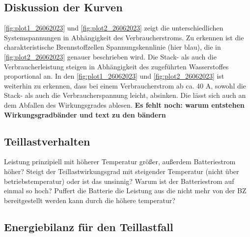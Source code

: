 \subsection{Diskussion der Kurven}
\autoref{fig:plot1_26062023} und \autoref{fig:plot2_26062023} zeigt die unterschiedlichen Systemspannungen in Abhängigkeit des
Verbraucherstroms. Zu erkennen ist die charakteristische Brennstoffzellen Spannungskennlinie (hier
blau), die in \autoref{fig:plot2_26062023} genauer beschrieben wird. Die Stack- als auch die Verbraucherleistung
steigen in Abhängigkeit des zugeführten Wasserstoffes proportional an. In den \autoref{fig:plot1_26062023} und \autoref{fig:plot2_26062023} ist weiterhin zu erkennen, dass bei einem Verbraucherstrom ab ca. 40 A, sowohl die Stack- als
auch die Verbraucherspannung leicht, absinken. Die lässt sich auch an dem Abfallen des
Wirkungsgrades ablesen. \textbf{Es fehlt noch: warum entstehen Wirkungsgradbänder und text zu den bändern}
\subsection{}
\subsection{Teillastverhalten}

Leistung prinzipiell mit höherer Temperatur größer, außerdem Batteriestrom höher? 
Steigt der Teillastwirkungsgrad mit steigender Temperatur (nicht über betriebstemperatur) oder ist das unsinnig?
Warum ist der Batteriestrom auf einmal so hoch? Puffert die Batterie die Leistung aus die nicht mehr von der BZ bereitgestellt werden kann durch die höhere temperatur?



\subsection{Energiebilanz für den Teillastfall}
